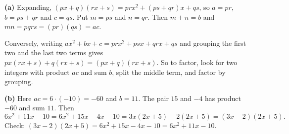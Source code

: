 \textbf{(a)} Expanding, $(px+q)(rx+s)=prx^2+(ps+qr)x+qs$, so $a=pr$, $b=ps+qr$ and $c=qs$. Put $m=ps$ and $n=qr$. Then $m+n=b$ and $mn=pqrs=(pr)(qs)=ac$.

Conversely, writing $ax^2+bx+c=prx^2+psx+qrx+qs$ and grouping the first two and the last two terms gives $px(rx+s)+q(rx+s)=(px+q)(rx+s)$. So to factor, look for two integers with product $ac$ and sum $b$, split the middle term, and factor by grouping.

\textbf{(b)} Here $ac=6\cdot(-10)=-60$ and $b=11$. The pair $15$ and $-4$ has product $-60$ and sum $11$. Then
\[
6x^2+11x-10=6x^2+15x-4x-10=3x(2x+5)-2(2x+5)=\boxed{(3x-2)(2x+5)} .
\]
Check: $(3x-2)(2x+5)=6x^2+15x-4x-10=6x^2+11x-10$.
